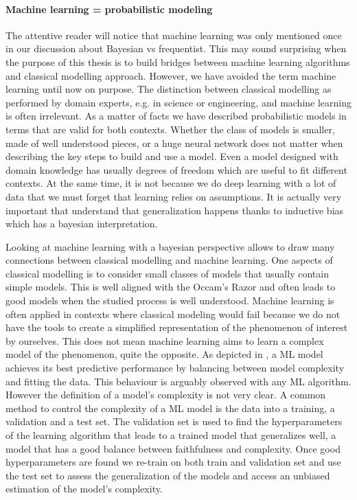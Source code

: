 \paragraph{Machine learning = probabilistic modeling}
The attentive reader will notice that machine learning was only mentioned once in our discussion about Bayesian vs frequentist.
This may sound surprising when the purpose of this thesis is to build bridges between machine learning algorithms and classical modelling approach. However, we have avoided the term machine learning until now on purpose. The distinction between classical modelling as performed by domain experts, e.g. in science or engineering, and machine learning is often irrelevant. As a matter of facts we have described probabilistic models in terms that are valid for both contexts. Whether the class of models is smaller, made of well understood pieces, or a huge neural network does not matter when describing the key steps to build and use a model. Even a model designed with domain knowledge has usually degrees of freedom which are useful to fit different contexts. At the same time, it is not because we do deep learning with a lot of data that we must forget that learning relies on assumptions. It is actually very important that understand that generalization happens thanks to inductive bias which has a bayesian interpretation.

Looking at machine learning with a bayesian perspective allows to draw many connections between classical modelling and machine learning. One aspects of classical modelling is to consider small classes of models that usually contain simple models. This is well aligned with the Occam's Razor and often leads to good models when the studied process is well understood. Machine learning is often applied in contexts where classical modeling would fail because we do not have the tools to create a simplified representation of the phenomenon of interest by ourselves. This does not mean machine learning aims to learn a complex model of the phenomenon, quite the opposite. As depicted in , a ML model achieves its best predictive performance by balancing between model complexity and fitting the data. This behaviour is arguably observed with any ML algorithm. However the definition of a model's complexity is not very clear. A common method to control the complexity of a ML model is the data into a training, a validation and a test set. The validation set is used to find the hyperparameters of the learning algorithm that leads to a trained model that generalizes well, a model that has a good balance between faithfulness and complexity. Once good hyperparameters are found we re-train on both train and validation set and use the test set to assess the generalization of the models and access an unbiased estimation of the model's complexity.

